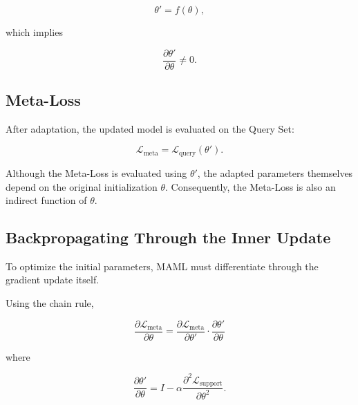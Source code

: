 \[
\theta' = f(\theta),
\]

which implies

\[
\frac{\partial \theta'}{\partial \theta}\neq0.
\]
\subsection*{Meta-Loss}

After adaptation, the updated model is evaluated on the Query Set:

\[
\mathcal{L}_{\text{meta}}
=
\mathcal{L}_{\text{query}}(\theta').
\]

Although the Meta-Loss is evaluated using $\theta'$, the adapted parameters themselves depend on the original initialization $\theta$. Consequently, the Meta-Loss is also an indirect function of $\theta$.
\subsection*{Backpropagating Through the Inner Update}

To optimize the initial parameters, MAML must differentiate through the gradient update itself.

Using the chain rule,

\[
\boxed{
\frac{\partial \mathcal{L}_{\text{meta}}}{\partial \theta}
=
\frac{\partial \mathcal{L}_{\text{meta}}}{\partial \theta'}
\cdot
\frac{\partial \theta'}{\partial \theta}
}
\]

where

\[
\frac{\partial \theta'}{\partial \theta}
=
I
-
\alpha
\frac{\partial^2
\mathcal{L}_{\text{support}}}
{\partial\theta^2}.
\]

